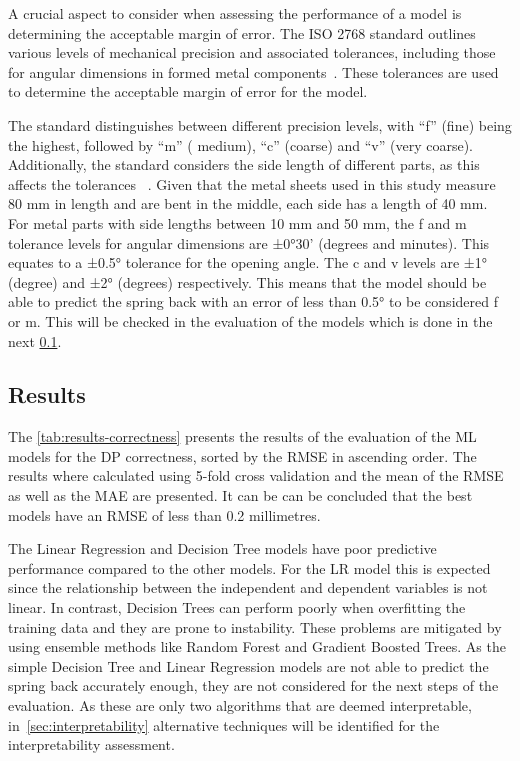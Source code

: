 A crucial aspect to consider when assessing the performance of a model is determining the acceptable margin of error.
The ISO 2768 standard outlines various levels of mechanical precision and associated tolerances, including those for
angular dimensions in formed metal components~\cite[pp. 1--3]{ISO2768}.
These tolerances are used to determine the acceptable margin of error for the model.

The standard distinguishes between different precision levels, with ``f'' (fine) being the highest, followed by ``m'' (
medium), ``c'' (coarse) and ``v'' (very coarse).
Additionally, the standard considers the side length of different parts, as this affects the tolerances
~\cite[p. 3]{ISO2768}.
Given that the metal sheets used in this study measure 80 mm in length and are bent in the middle, each side has a
length of 40 mm.
For metal parts with side lengths between 10 mm and 50 mm, the f and m tolerance levels for angular
dimensions are ±0°30' (degrees and minutes).
This equates to a ±0.5° tolerance for the opening angle.
The c and v levels are ±1° (degree) and ±2° (degrees) respectively.
This means that the model should be able to predict the spring back with an error of less than 0.5° to be considered
f or m.
This will be checked in the evaluation of the models which is done in the next \cref{subsec:results}.

\subsection{Results}\label{subsec:results}
The \cref{tab:results-correctness} presents the results of the evaluation of the \ac{ML} models for
the \ac{DP} correctness, sorted by the RMSE in ascending order.
The results where calculated using 5-fold cross validation and the mean of the RMSE as well as the MAE are presented.
It can be can be concluded that the best models have an RMSE of less than 0.2 millimetres.

The Linear Regression and Decision Tree models have poor predictive performance compared to the other models.
For the \ac{LR} model this is expected since the relationship between the independent and dependent variables is
not linear.
In contrast, Decision Trees can perform poorly when overfitting the training data and they are prone to
instability.
These problems are mitigated by using ensemble methods like Random Forest and Gradient Boosted Trees.
As the simple Decision Tree and Linear Regression models are not able to predict the spring back accurately enough,
they are not considered for the next steps of the evaluation.
As these are only two algorithms that are deemed interpretable, in~\cref{sec:interpretability} alternative techniques
will be identified for the interpretability assessment.

